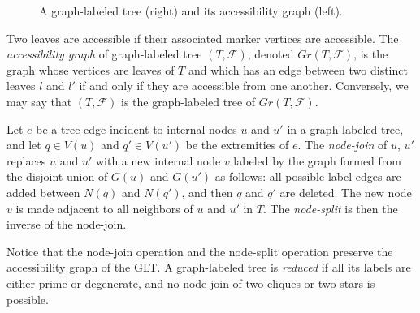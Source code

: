 \documentclass{llncs}
\newcommand{\FF}{\mathcal{F}}
\def\GLT{graph-labeled tree}
\begin{document}
{\begin{figure}
\begin{center}
{
}
\end{center}
\caption{A graph-labeled tree (right) and its accessibility graph (left).}
\end{figure}

Two leaves are accessible if their associated marker vertices are accessible. The \emph{accessibility graph} of graph-labeled tree $(T,\FF)$, denoted $Gr(T,\FF)$, is the graph whose vertices are leaves of $T$ and which has an edge between two distinct leaves $l$ and $l'$ if and only if they are accessible from one another. Conversely, we may say that $(T,\FF)$ is the graph-labeled tree of $Gr(T,\FF)$.

\begin{definition}
Let $e$ be a tree-edge incident to internal nodes $u$ and $u'$ in a \GLT, and let
$q\in V (u)$ and $q' \in V (u')$ be the extremities of $e$. The \emph{node-join} of $u$, $u'$ replaces $u$
and $u'$ with a new internal node $v$ labeled by the graph formed from the disjoint union of $G(u)$ and $G(u')$ as
follows: all possible label-edges are added between $N (q)$ and $N (q' )$, and then $q$ and
$q'$ are deleted. The new node $v$ is made adjacent to all neighbors of $u$ and $u'$ in $T$.
The \emph{node-split} is then the inverse of the node-join.
\end{definition}

Notice that the node-join operation and the node-split operation preserve the
accessibility graph of the GLT. A graph-labeled tree is \emph{reduced} if all its labels are either prime or degenerate, and no node-join of two cliques or two stars is possible.

}
\end{document}
